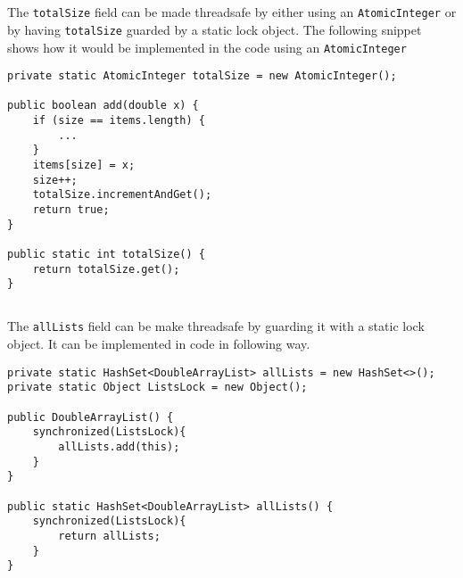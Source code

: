 \documentclass{ituhandin}
\begin{document}
\chapter{} %
\section{}
The \texttt{totalSize} field can be made threadsafe by either using an \texttt{AtomicInteger} or by having \texttt{totalSize} guarded by a static lock object. The following snippet shows how it would be implemented in the code using an \texttt{AtomicInteger}

\begin{lstlisting}[frame={}]
private static AtomicInteger totalSize = new AtomicInteger();

public boolean add(double x) {
    if (size == items.length) {
        ...
    }
    items[size] = x;
    size++;
    totalSize.incrementAndGet();
    return true;
}

public static int totalSize() {
    return totalSize.get();
}
\end{lstlisting}

\section{}
The \texttt{allLists} field can be make threadsafe by guarding it with a static lock object. It can be implemented in code in following way.
\begin{lstlisting}[frame={}]
private static HashSet<DoubleArrayList> allLists = new HashSet<>();
private static Object ListsLock = new Object();

public DoubleArrayList() {
    synchronized(ListsLock){
        allLists.add(this);
    }
}

public static HashSet<DoubleArrayList> allLists() {
    synchronized(ListsLock){
        return allLists;
    }
}
\end{lstlisting}

\chapter{} %
\chapter{} %
\section{} %
\section{} %
\end{document}
